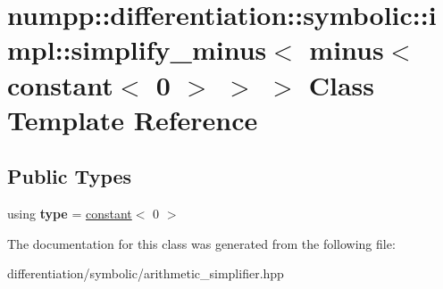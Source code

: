 \hypertarget{classnumpp_1_1differentiation_1_1symbolic_1_1impl_1_1simplify__minus_3_01minus_3_01constant_3_010_01_4_01_4_01_4}{}\section{numpp\+:\+:differentiation\+:\+:symbolic\+:\+:impl\+:\+:simplify\+\_\+minus$<$ minus$<$ constant$<$ 0 $>$ $>$ $>$ Class Template Reference}
\label{classnumpp_1_1differentiation_1_1symbolic_1_1impl_1_1simplify__minus_3_01minus_3_01constant_3_010_01_4_01_4_01_4}
\subsection*{Public Types}
\begin{DoxyCompactItemize}
\item 
\mbox{\label{classnumpp_1_1differentiation_1_1symbolic_1_1impl_1_1simplify__minus_3_01minus_3_01constant_3_010_01_4_01_4_01_4_a43f0b8c48ab5bb0e9d17e377edc18cb9}} 
using {\bfseries type} = \hyperlink{classnumpp_1_1differentiation_1_1symbolic_1_1constant}{constant}$<$ 0 $>$
\end{DoxyCompactItemize}


The documentation for this class was generated from the following file\+:\begin{DoxyCompactItemize}
\item 
differentiation/symbolic/arithmetic\+\_\+simplifier.\+hpp\end{DoxyCompactItemize}
